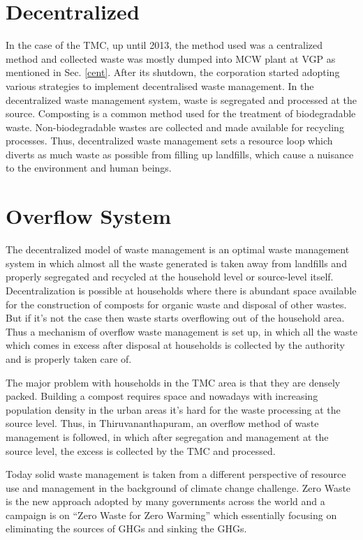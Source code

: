 \documentclass[12pt,a4paper]{report}
\begin{document}
\section{Decentralized}

In the case of the TMC, up until 2013, the method used was a centralized method and collected waste was mostly dumped into MCW plant at VGP as mentioned in Sec. \ref{cent}. After its shutdown,  the corporation started adopting various strategies to implement decentralised waste management. In the decentralized waste management system, waste is segregated and processed at the source. Composting is a common method used for the treatment of biodegradable waste. Non-biodegradable wastes are collected and made available for recycling processes. Thus, decentralized waste management sets a resource loop which diverts as much waste as possible from filling up landfills, which cause a nuisance to the environment and human beings.

\section{Overflow System}
\label{overflow}
The decentralized model of waste management is an optimal waste management system in which almost all the waste generated is taken away from landfills and properly segregated and recycled at the household level or source-level itself. Decentralization is possible at households where there is abundant space available for the construction of composts for organic waste and disposal of other wastes. But if it's not the case then waste starts overflowing out of the household area. Thus a mechanism of overflow waste management is set up,  in which all the waste which comes in excess after disposal at households is collected by the authority and is properly taken care of.

The major problem with households in the TMC area is that they are densely packed. Building a compost requires space and nowadays with increasing population density in the urban areas it's hard for the waste processing at the source level. Thus, in Thiruvananthapuram, an overflow method of waste management is followed, in which after segregation and management at the source level, the excess is collected by the TMC and processed.

Today solid waste management is taken from a different perspective of resource use and management in the background of climate change challenge. Zero Waste is the new approach adopted by many governments across the world and a campaign is on “Zero Waste for Zero Warming” which essentially focusing on eliminating the sources of GHGs and sinking the GHGs.
\end{document}
